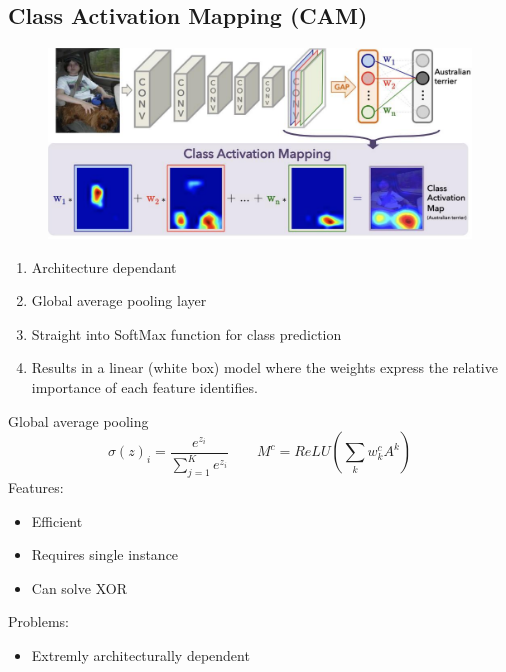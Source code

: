\subsection{Class Activation Mapping (CAM)}
\begin{figure}[!h]
    \includegraphics[width =  \columnwidth]{figures/XAI2/CAM.png}
\end{figure}
\begin{enumerate}
    \item Architecture dependant
    \item Global average pooling layer
    \item Straight into SoftMax function for class prediction
    \item Results in a linear (white box) model where the weights express the relative importance of each feature identifies.
\end{enumerate}
Global average pooling
\[
\sigma(z)_i = \frac{e^{z_i}}{\sum_{j = 1}^{K}e^{z_i}} \qquad M^c = ReLU\left(\sum_{k}w_k^c A^k\right)
\]
Features:
\begin{itemize}
    \item Efficient
    \item Requires single instance
    \item Can solve XOR
\end{itemize}

Problems:
\begin{itemize}
    \item Extremly architecturally dependent
\end{itemize}
